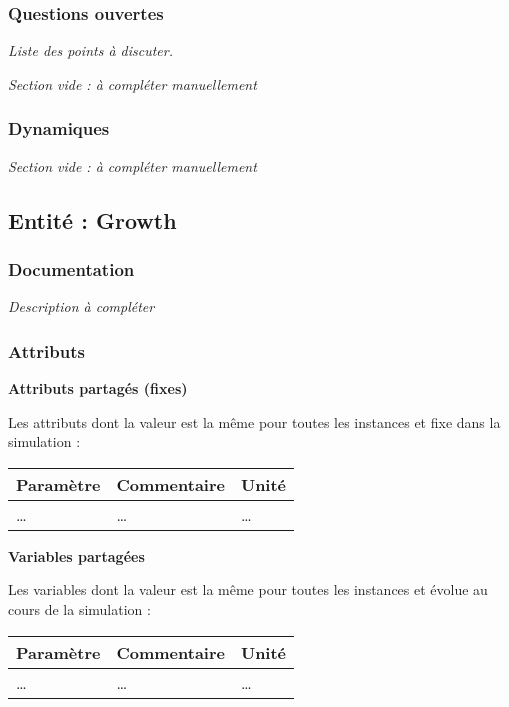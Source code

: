 \documentclass[
]{article}
\begin{document}
\subsubsection{Questions ouvertes}\label{questions-ouvertes-12}

\emph{Liste des points à discuter.}

\emph{Section vide : à compléter manuellement}

\subsubsection{Dynamiques}\label{dynamiques-12}

\emph{Section vide : à compléter manuellement}

\subsection{Entité : Growth}\label{entituxe9-growth}

\subsubsection{Documentation}\label{documentation-17}

\emph{Description à compléter}

\subsubsection{Attributs}\label{attributs-17}

\textbf{Attributs partagés (fixes)}

Les attributs dont la valeur est la même pour toutes les instances et
fixe dans la simulation :

\begin{longtable}[]{@{}lll@{}}
\toprule\noalign{}
\textbf{Paramètre} & \textbf{Commentaire} & \textbf{Unité} \\
\midrule\noalign{}
\endhead
\bottomrule\noalign{}
\endlastfoot
\ldots{} & \ldots{} & \ldots{} \\
\end{longtable}

\textbf{Variables partagées}

Les variables dont la valeur est la même pour toutes les instances et
évolue au cours de la simulation :

\begin{longtable}[]{@{}lll@{}}
\toprule\noalign{}
\textbf{Paramètre} & \textbf{Commentaire} & \textbf{Unité} \\
\midrule\noalign{}
\endhead
\bottomrule\noalign{}
\endlastfoot
\ldots{} & \ldots{} & \ldots{} \\
\end{longtable}
\end{document}
